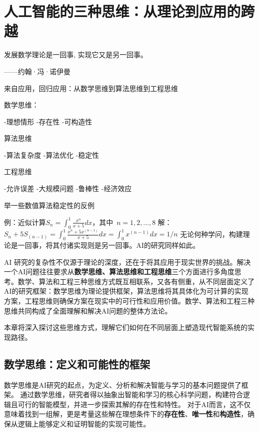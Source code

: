 \chapter{人工智能的三种思维：从理论到应用的跨越}


发展数学理论是一回事, 实现它又是另一回事。

\begin{flushright}
 ------约翰·冯·诺伊曼
\end{flushright}


来自应用，回归应用：从数学思维到算法思维到工程思维


数学思维：

-理想情形
-存在性
-可构造性

算法思维

-算法复杂度
-算法优化
-稳定性

工程思维

-允许误差
-大规模问题
-鲁棒性
-经济效应

举一些数值算法稳定性的反例

例：近似计算$S_n=\int_0^1 \frac{x^n}{x+5}dx$，其中~$n=1,2,…,8$
解：$S_n+5S_(n-1)=\int_0^1 \frac{x^n+5x^(n-1)}{x+5}dx=\int_0^1 x^(n-1)dx=1/n$
无论何种学问，构建理论是一回事，将其付诸实现则是另一回事。AI的研究同样如此。 

AI 研究的复杂性不仅源于理论的深度，还在于将其应用于现实世界的挑战。解决一个AI问题往往要求从{\bf 数学思维、算法思维和工程思维}三个方面进行多角度思考。数学、算法和工程三种思维方式既互相联系，又各有侧重，从不同层面定义了AI的研究框架：数学思维为理论提供框架，算法思维将其具体化为可计算的实现方案，工程思维则确保方案在现实中的可行性和应用价值。数学、算法和工程三种思维共同构成了全面理解和解决AI问题的整体方法论。

本章将深入探讨这些思维方式，理解它们如何在不同层面上塑造现代智能系统的实现路径。

\section{数学思维：定义和可能性的框架}

数学思维是AI研究的起点，为定义、分析和解决智能与学习的基本问题提供了框架。
通过数学思维，研究者得以抽象出智能和学习的核心科学问题，构建符合逻辑且可行的智能模型，并进一步探索其解的存在性和特性。
对于AI而言，这不仅意味着找到一组解，更是考量这些解在理想条件下的{\bf 存在性}、{\bf 唯一性}和{\bf 构造性}，确保从逻辑上能够定义和证明智能的实现可能性。

